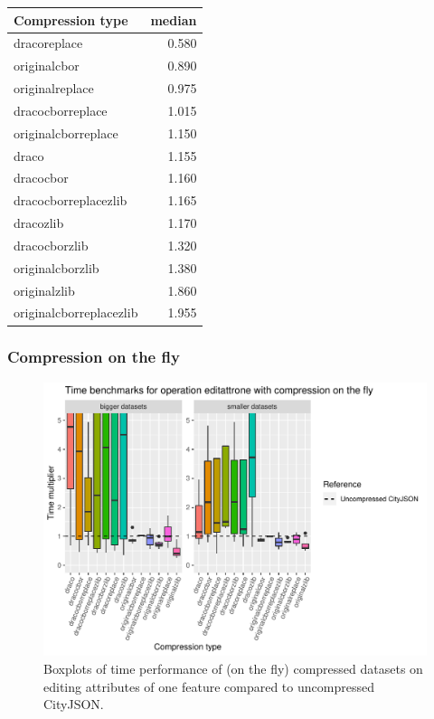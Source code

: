 \begin{table}[!h]
\begin{minipage}{.5\linewidth}
\begin{tabular}{|l|r|}
\hline
Compression type & median\\
\hline
dracoreplace & 0.580\\
\hline
originalcbor & 0.890\\
\hline
originalreplace & 0.975\\
\hline
dracocborreplace & 1.015\\
\hline
originalcborreplace & 1.150\\
\hline
draco & 1.155\\
\hline
dracocbor & 1.160\\
\hline
dracocborreplacezlib & 1.165\\
\hline
dracozlib & 1.170\\
\hline
dracocborzlib & 1.320\\
\hline
originalcborzlib & 1.380\\
\hline
originalzlib & 1.860\\
\hline
originalcborreplacezlib & 1.955\\
\hline
\end{tabular}
\end{minipage} 
\end{table}



\subsubsection{Compression on the fly}

\begin{figure}[h!]
    \includegraphics[scale=0.92]{figs/benchmark/individualotf/editattrone.pdf}
    \caption{Boxplots of time performance of (on the fly) compressed datasets on editing attributes of one feature compared to uncompressed CityJSON.}
    \label{figotf:sdvis}
\end{figure}

